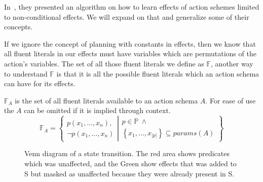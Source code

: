 \documentclass[../Master.tex]{subfiles}
\begin{document}
In~\cite{Walsh2008}, they presented an algorithm on how to learn effects of action schemes limited to non-conditional effects. We will expand on that and generalize some of their concepts.

If we ignore the concept of planning with constants in effects, then we know that all fluent literals in our effects must have variables which are permutations of the action's variables. The set of all those fluent literals we define as $\mathbb{F}$, another way to understand $\mathbb{F}$ is that it is all the possible fluent literals which an action schema can have for its effects.

\begin{definition} 
$\mathbb{F}_A$ is the set of all fluent literals available to an action schema $A$. For ease of use the $A$ can be omitted if it is implied through context.
	\begin{equation*}
		\mathbb{F}_A = \left\{ 
				\begin{gathered}
					p(x_1,\dots,x_n), \\
					\neg p(x_1,\dots,x_n)
				\end{gathered}
					\left|
				\begin{gathered} p \in \mathbb{P}~\land \\
                    \left\{ x_1,\dots,x_{|p|} \right\} \subseteq params(A)
				\end{gathered}				
							\right.\right\}
	\end{equation*}
\end{definition}


\begin{figure}
	\def\firstcircle{(0,0) circle (1.5cm)}
	\def\secondcircle{(0:2cm) circle (1.5cm)}
	\def\thirdcircle{(0:3.8cm) circle (2.9cm)}
	\centering
\caption{\label{fig:nca:venn-of-effects} Venn diagram of a state transition. The red area shows predicates which was unaffected, and the Green show effects that was added to S but masked as unaffected because they were already present in S.}

\end{figure}
\end{document}
